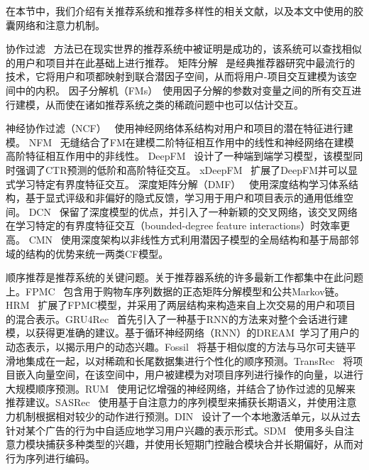 
在本节中，我们介绍有关推荐系统和推荐多样性的相关文献，以及本文中使用的胶囊网络和注意力机制。

协作过滤~\cite{sarwar2001item,schafer2007collaborative} 方法已在现实世界的推荐系统中被证明是成功的，该系统可以查找相似的用户和项目并在此基础上进行推荐。 矩阵分解~\cite{koren2009matrix} 是经典推荐器研究中最流行的技术，它将用户和项都映射到联合潜因子空间，从而将用户-项目交互建模为该空间中的内积。 因子分解机（FMs）~\cite{rendle2010factorization}使用因子分解的参数对变量之间的所有交互进行建模，从而使在诸如推荐系统之类的稀疏问题中也可以估计交互。

神经协作过滤（NCF）~\cite{he2017neural} 使用神经网络体系结构对用户和项目的潜在特征进行建模。
NFM~\cite{he2017nfm} 无缝结合了FM在建模二阶特征相互作用中的线性和神经网络在建模高阶特征相互作用中的非线性。
DeepFM~\cite{guo2017deepfm} 设计了一种端到端学习模型，该模型同时强调了CTR预测的低阶和高阶特征交互。
xDeepFM~\cite{lian2018xdeepfm} 扩展了DeepFM并可以显式学习特定有界度特征交互。
深度矩阵分解（DMF）~\cite{xue2017deep} 使用深度结构学习体系结构，基于显式评级和非偏好的隐式反馈，学习用于用户和项目表示的通用低维空间。
DCN~\cite{wang2017deep} 保留了深度模型的优点，并引入了一种新颖的交叉网络，该交叉网络在学习特定的有界度特征交互（bounded-degree feature interactions）时效率更高。
CMN~\cite{ebesu2018collaborative} 使用深度架构以非线性方式利用潜因子模型的全局结构和基于局部邻域的结构的优势来统一两类CF模型。


顺序推荐是推荐系统的关键问题。关于推荐器系统的许多最新工作都集中在此问题上。FPMC~\cite{rendle2010factorizing} 包含用于购物车序列数据的正态矩阵分解模型和公共Markov链。HRM~\cite{wang2015learning} 扩展了FPMC模型，并采用了两层结构来构造来自上次交易的用户和项目的混合表示。GRU4Rec~\cite{hidasi2015session} 首先引入了一种基于RNN的方法来对整个会话进行建模，以获得更准确的建议。基于循环神经网络（RNN）的DREAM~\cite{yu2016dynamic}学习了用户的动态表示，以揭示用户的动态兴趣。Fossil~\cite{he2016fusing} 将基于相似度的方法与马尔可夫链平滑地集成在一起，以对稀疏和长尾数据集进行个性化的顺序预测。TransRec~\cite{he2017translation} 将项目嵌入向量空间，在该空间中，用户被建模为对项目序列进行操作的向量，以进行大规模顺序预测。RUM~\cite{chen2018sequential} 使用记忆增强的神经网络，并结合了协作过滤的见解来推荐建议。SASRec~\cite{kang2018self} 使用基于自注意力的序列模型来捕获长期语义，并使用注意力机制根据相对较少的动作进行预测。DIN~\cite{zhou2018deep} 设计了一个本地激活单元，以从过去针对某个广告的行为中自适应地学习用户兴趣的表示形式。SDM~\cite{lv2019sdm} 使用多头自注意力模块捕获多种类型的兴趣，并使用长短期门控融合模块合并长期偏好，从而对行为序列进行编码。

